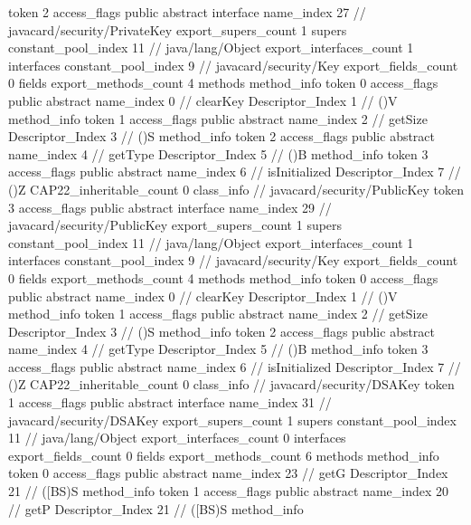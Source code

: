 {{{			token	2
			access_flags	public abstract interface
			name_index	27		// javacard/security/PrivateKey
			export_supers_count	1
			supers {
				constant_pool_index	11		// java/lang/Object
			}
			export_interfaces_count	1
			interfaces {
				constant_pool_index	9		// javacard/security/Key
			}
			export_fields_count	0
			fields {
			}
			export_methods_count	4
			methods {
				method_info {
					token	0
					access_flags	public abstract
					name_index	0		// clearKey
					Descriptor_Index	1		// ()V
				}
				method_info {
					token	1
					access_flags	public abstract
					name_index	2		// getSize
					Descriptor_Index	3		// ()S
				}
				method_info {
					token	2
					access_flags	public abstract
					name_index	4		// getType
					Descriptor_Index	5		// ()B
				}
				method_info {
					token	3
					access_flags	public abstract
					name_index	6		// isInitialized
					Descriptor_Index	7		// ()Z
				}
			}
			CAP22_inheritable_count	0
		}
		class_info {		// javacard/security/PublicKey
			token	3
			access_flags	public abstract interface
			name_index	29		// javacard/security/PublicKey
			export_supers_count	1
			supers {
				constant_pool_index	11		// java/lang/Object
			}
			export_interfaces_count	1
			interfaces {
				constant_pool_index	9		// javacard/security/Key
			}
			export_fields_count	0
			fields {
			}
			export_methods_count	4
			methods {
				method_info {
					token	0
					access_flags	public abstract
					name_index	0		// clearKey
					Descriptor_Index	1		// ()V
				}
				method_info {
					token	1
					access_flags	public abstract
					name_index	2		// getSize
					Descriptor_Index	3		// ()S
				}
				method_info {
					token	2
					access_flags	public abstract
					name_index	4		// getType
					Descriptor_Index	5		// ()B
				}
				method_info {
					token	3
					access_flags	public abstract
					name_index	6		// isInitialized
					Descriptor_Index	7		// ()Z
				}
			}
			CAP22_inheritable_count	0
		}
		class_info {		// javacard/security/DSAKey
			token	1
			access_flags	public abstract interface
			name_index	31		// javacard/security/DSAKey
			export_supers_count	1
			supers {
				constant_pool_index	11		// java/lang/Object
			}
			export_interfaces_count	0
			interfaces {
			}
			export_fields_count	0
			fields {
			}
			export_methods_count	6
			methods {
				method_info {
					token	0
					access_flags	public abstract
					name_index	23		// getG
					Descriptor_Index	21		// ([BS)S
				}
				method_info {
					token	1
					access_flags	public abstract
					name_index	20		// getP
					Descriptor_Index	21		// ([BS)S
				}
				method_info {
}}}}}
